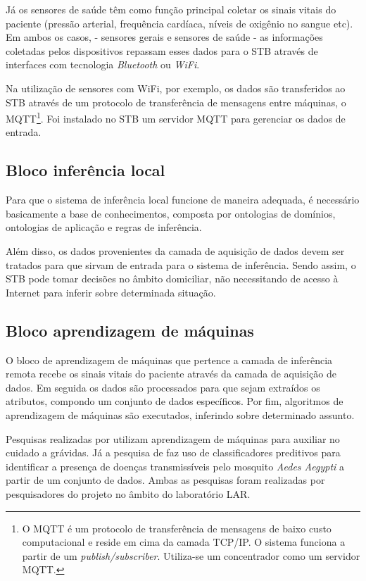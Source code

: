 Já os sensores de saúde têm como função principal coletar os sinais vitais do
paciente (pressão arterial, frequência cardíaca, níveis de oxigênio no sangue
etc). Em ambos os casos, - sensores gerais e sensores de saúde - as informações
coletadas pelos dispositivos repassam  esses dados para o STB através de
interfaces com tecnologia  \textit{Bluetooth} ou \textit{WiFi}.

Na utilização de sensores com WiFi, por exemplo, os dados são transferidos ao
STB através de um protocolo de transferência de mensagens entre máquinas, o
MQTT\footnote{O MQTT é um protocolo de transferência de mensagens de baixo
custo computacional e reside em cima da camada TCP/IP. O sistema funciona a
partir de um \textit{publish/subscriber}. Utiliza-se um concentrador como um
servidor MQTT.}.  Foi instalado no STB um servidor MQTT para gerenciar os dados
de entrada.

\subsection{Bloco inferência local}

Para que o sistema de inferência local funcione de maneira adequada, é
necessário basicamente a base de conhecimentos, composta por ontologias de
domínios, ontologias de aplicação e regras de inferência. 

Além disso, os dados provenientes da camada de aquisição de dados devem ser
tratados para que sirvam de entrada para o sistema de inferência. Sendo assim,
o STB pode tomar decisões no âmbito domiciliar, não necessitando de acesso
à Internet para inferir sobre determinada situação.

\subsection{Bloco aprendizagem de máquinas}

O bloco de aprendizagem de máquinas que pertence a camada de inferência remota
recebe os sinais vitais do paciente através da camada de aquisição de
dados. Em seguida os dados são processados para que sejam extraídos os atributos,
compondo um conjunto de dados específicos. Por fim, algoritmos de aprendizagem
de máquinas são executados, inferindo sobre determinado assunto.

Pesquisas realizadas por  utilizam aprendizagem de
máquinas para auxiliar no cuidado a grávidas. Já a pesquisa de
 faz uso de classificadores preditivos para identificar a
presença de doenças transmissíveis pelo mosquito \textit{Aedes Aegypti} a partir
de um conjunto de dados. Ambas as pesquisas foram realizadas por pesquisadores 
do projeto \nextsaude[] no âmbito do laboratório LAR.

